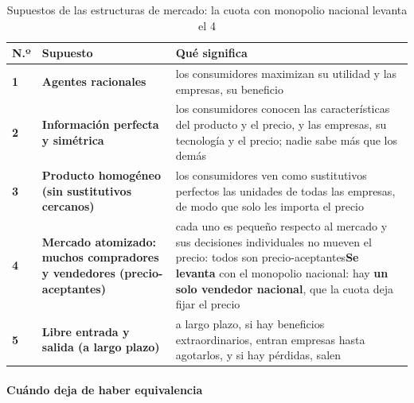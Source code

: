 \documentclass[11pt]{article}
\begin{document}
\begin{table}[H]
\centering
\caption{Supuestos de las estructuras de mercado: la cuota con monopolio nacional levanta el 4}\label{tab:supuestos-cuota}
\small
\begin{tabular}{>{\centering\arraybackslash}m{0.7cm}>{\raggedright\arraybackslash}m{4.3cm}>{\raggedright\arraybackslash}m{9.8cm}}
\toprule
\rowcolor{tceeazulpalido}\textbf{N.º} & \textbf{Supuesto} & \textbf{Qué significa}\\
\midrule
\textcolor{tceemorado}{\textbf{1}} & \textbf{Agentes racionales} & los consumidores maximizan su utilidad y las empresas, su beneficio\\
\addlinespace[0.3em]
\textcolor{tceemorado}{\textbf{2}} & \textbf{Información perfecta y simétrica} & los consumidores conocen las características del producto y el precio, y las empresas, su tecnología y el precio; nadie sabe más que los demás\\
\addlinespace[0.3em]
\textcolor{tceemorado}{\textbf{3}} & \textbf{Producto homogéneo (sin sustitutivos cercanos)} & los consumidores ven como sustitutivos perfectos las unidades de todas las empresas, de modo que solo les importa el precio\\
\addlinespace[0.3em]
\rowcolor{tceesalmon}\textcolor{tceemorado}{\textbf{4}} & \textbf{Mercado atomizado: muchos compradores y vendedores (precio-aceptantes)} & cada uno es pequeño respecto al mercado y sus decisiones individuales no mueven el precio: todos son precio-aceptantes\newline \textcolor{tceerojo}{\textbf{Se levanta}} con el monopolio nacional: hay \textbf{un solo vendedor nacional}, que la cuota deja fijar el precio\\
\addlinespace[0.3em]
\textcolor{tceemorado}{\textbf{5}} & \textbf{Libre entrada y salida (a largo plazo)} & a largo plazo, si hay beneficios extraordinarios, entran empresas hasta agotarlos, y si hay pérdidas, salen\\
\bottomrule
\end{tabular}
\end{table}

\paragraph{Cuándo deja de haber equivalencia}
\end{document}

